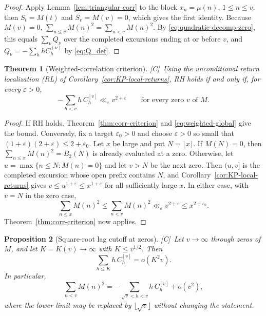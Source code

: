 \documentclass[11pt,reqno]{amsart}
\numberwithin{equation}{section}
\theoremstyle{plain}
\newtheorem{theorem}{Theorem}[section]
\newtheorem{proposition}[theorem]{Proposition}
\theoremstyle{definition}
\theoremstyle{remark}
\newcommand{\eps}{\varepsilon}
\newcommand{\tagC}{\textup{[C]}}
\begin{document}
\begin{proof}
Apply Lemma~\ref{lem:triangular-corr} to the block $x_n=\mu(n)$,
$1\le n\le v$: then $S_t=M(t)$ and $S_v=M(v)=0$, which gives the first
identity. Because $M(v)=0$, $\sum_{n\le v}M(n)^2=\sum_{n<v}M(n)^2$.  By
\eqref{eq:quadratic-decomp-zero}, this equals $\sum_\nu Q_\nu$ over the completed excursions ending at or before $v$, and
$Q_\nu=-\sum_hhC^{(\nu)}_h$ by \eqref{eq:Q_def}.
\end{proof}

\begin{theorem}[Weighted-correlation criterion]
\label{thm:weighted-corr-RH}
\tagC\ Using the unconditional return localization (RL) of
Corollary~\ref{cor:KP-local-returns}, RH holds if and only if, for every $\eps>0$,
\begin{equation}
-\sum_{h<v}h\,C^{[v]}_h\ll_\eps v^{2+\eps}
\qquad\text{for every zero $v$ of $M$.}
\end{equation}
\end{theorem}

\begin{proof}
If RH holds, Theorem~\ref{thm:corr-criterion} and
\eqref{eq:weighted-global} give the bound. Conversely, fix a target
$\eps_0>0$ and choose $\eps>0$ so small that
$(1+\eps)(2+\eps)\le2+\eps_0$. Let $x$ be large and put $N=\lfloor x\rfloor$.  If $M(N)=0$, then
$\sum_{n\le x}M(n)^2=B_2(N)$ is already evaluated at a zero.  Otherwise,
let $u=\max\{n\le N:M(n)=0\}$ and let $v> N$ be the next zero.  Then
$(u,v]$ is the completed excursion whose open prefix contains $N$, and
Corollary~\ref{cor:KP-local-returns} gives
$v\le u^{1+\eps}\le x^{1+\eps}$ for all sufficiently large $x$.  In
either case, with $v=N$ in the zero case,
\begin{equation}
\sum_{n\le x}M(n)^2\le\sum_{n<v}M(n)^2
\ll_\eps v^{2+\eps}\le x^{2+\eps_0}.
\end{equation}
Theorem~\ref{thm:corr-criterion} now applies.
\end{proof}

\begin{proposition}[Square-root lag cutoff at zeros]
\label{prop:sqrt-lag-cutoff}
\tagC\ Let $v\to\infty$ through zeros of $M$, and let $K=K(v)\to\infty$ with
$K\le v^{1/2}$. Then
\begin{equation}
\label{eq:small-lag-weighted}
\sum_{h\le K}h\,C_h^{[v]}=o(K^2v).
\end{equation}
In particular,
\begin{equation}
\label{eq:sqrt-lag-tail}
\sum_{n<v}M(n)^2
=-\sum_{\sqrt v<h<v}h\,C_h^{[v]}+o(v^2),
\end{equation}
where the lower limit may be replaced by $\lfloor\sqrt v\rfloor$ without
changing the statement.
\end{proposition}
\end{document}
